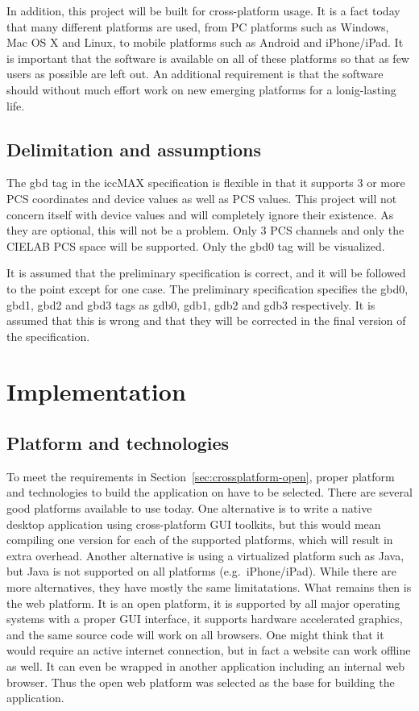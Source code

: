 In addition, this project will be built for cross-platform usage.
It is a fact today that many different platforms are used, from PC platforms such as Windows, Mac OS X and Linux, to mobile platforms such as Android and iPhone/iPad.
It is important that the software is available on all of these platforms so that as few users as possible are left out.
An additional requirement is that the software should without much effort work on new emerging platforms for a lonig-lasting life.

\subsection{Delimitation and assumptions}
The gbd tag in the iccMAX specification is flexible in that it supports 3 or more PCS coordinates and device values as well as PCS values.
This project will not concern itself with device values and will completely ignore their existence.
As they are optional, this will not be a problem.
Only 3 PCS channels and only the CIELAB PCS space will be supported.
Only the gbd0 tag will be visualized.

It is assumed that the preliminary specification is correct, and it will be followed to the point except for one case.
The preliminary specification specifies the gbd0, gbd1, gbd2 and gbd3 tags as gdb0, gdb1, gdb2 and gdb3 respectively.
It is assumed that this is wrong and that they will be corrected in the final version of the specification.

\section{Implementation}

\subsection{Platform and technologies}
To meet the requirements in Section~\ref{sec:crossplatform-open}, proper platform and technologies to build the application on have to be selected.
There are several good platforms available to use today.
One alternative is to write a native desktop application using cross-platform GUI toolkits, but this would mean compiling one version for each of the supported platforms, which will result in extra overhead.
Another alternative is using a virtualized platform such as Java, but Java is not supported on all platforms (e.g.\ iPhone/iPad).
While there are more alternatives, they have mostly the same limitatations.
What remains then is the web platform.
It is an open platform, it is supported by all major operating systems with a proper GUI interface, it supports hardware accelerated graphics, and the same source code will work on all browsers.
One might think that it would require an active internet connection, but in fact a website can work offline as well.
It can even be wrapped in another application including an internal web browser.
Thus the open web platform was selected as the base for building the application.

